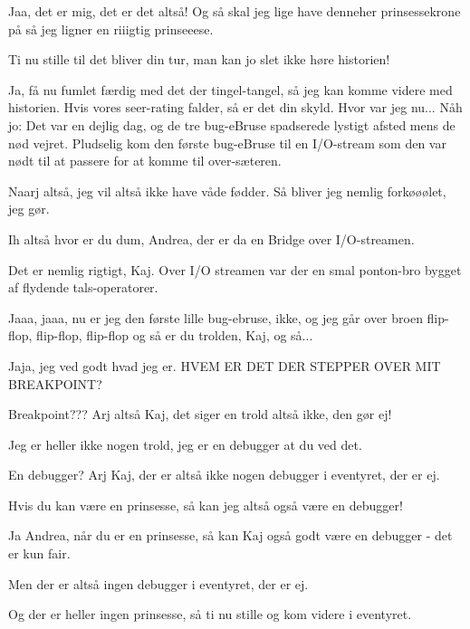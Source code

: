 \documentclass[a4paper,11pt]{article}
\begin{document}
\begin{sketch}
   Jaa, det er mig, det er det altså! Og så skal jeg lige have denneher
  prinsessekrone på så jeg ligner en riiigtig prinseeese.  

   Ti nu stille til det bliver din tur, man kan jo slet ikke høre
  historien!

   Ja, få nu fumlet færdig med det der tingel-tangel, så jeg kan komme
  videre med historien. Hvis vores seer-rating falder, så er det din skyld.  Hvor
  var jeg nu... Nåh jo:  Det var en
  dejlig dag, og de tre bug-eBruse spadserede lystigt afsted mens de nød vejret.
  Pludselig kom den første bug-eBruse til en I/O-stream som den var nødt til at
  passere for at komme til over-sæteren.
   
   Naarj altså, jeg vil altså ikke have våde fødder. Så bliver jeg nemlig
  forkøøølet, jeg gør.

   Ih altså hvor er du dum, Andrea, der er da en Bridge over
  I/O-streamen.
   
   Det er nemlig rigtigt, Kaj.   Over
  I/O streamen var der en smal ponton-bro bygget af flydende tals-operatorer.

   Jaaa, jaaa, nu er jeg den første lille bug-ebruse, ikke, og jeg går
  over broen  flip-flop, flip-flop, flip-flop
   og så er du trolden, Kaj, og så...

   Jaja, jeg ved godt hvad jeg er.   HVEM ER DET
  DER STEPPER OVER MIT BREAKPOINT?

   Breakpoint??? Arj altså Kaj, det siger en trold altså ikke, den gør
  ej!

   Jeg er heller ikke nogen trold, jeg er en debugger at du ved det.

   En debugger? Arj Kaj, der er altså ikke nogen debugger i eventyret,
  der er ej.

   Hvis du kan være en prinsesse, så kan jeg altså også være en debugger!

   Ja Andrea, når du er en prinsesse, så kan Kaj også godt være en
  debugger - det er kun fair.

   Men der er altså ingen debugger i eventyret, der er ej.

   Og der er heller ingen prinsesse, så ti nu stille og kom videre i
  eventyret.


\end{sketch}
\end{document}
